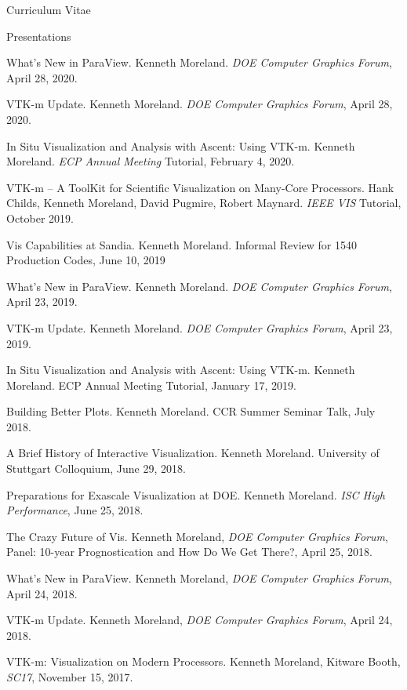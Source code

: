 \documentclass{article}
\begin{document}
\begin{cv}{Curriculum Vitae}
    \begin{cvlist}{Presentations}
    \item[What's New in ParaView.]
      Kenneth Moreland.
      \emph{DOE Computer Graphics Forum}, April 28, 2020.
    \item[VTK-m Update.]
      Kenneth Moreland.
      \emph{DOE Computer Graphics Forum}, April 28, 2020.
    \item[In Situ Visualization and Analysis with Ascent: Using VTK-m.]
      Kenneth Moreland.
      \emph{ECP Annual Meeting} Tutorial, February 4, 2020.
    \item[VTK-m -- A ToolKit for Scientific Visualization on Many-Core Processors.]
      Hank Childs, Kenneth Moreland, David Pugmire, Robert Maynard.
      \emph{IEEE VIS} Tutorial, October 2019.
    \item[Vis Capabilities at Sandia.]
      Kenneth Moreland.
      Informal Review for 1540 Production Codes, June 10, 2019
    \item[What's New in ParaView.]
      Kenneth Moreland.
      \emph{DOE Computer Graphics Forum}, April 23, 2019.
    \item[VTK-m Update.]
      Kenneth Moreland.
      \emph{DOE Computer Graphics Forum}, April 23, 2019.
    \item[In Situ Visualization and Analysis with Ascent: Using VTK-m.]
      Kenneth Moreland.
      ECP Annual Meeting Tutorial, January 17, 2019.
    \item[Building Better Plots.]
      Kenneth Moreland.
      CCR Summer Seminar Talk, July 2018.
    \item[A Brief History of Interactive Visualization.]
      Kenneth Moreland.
      University of Stuttgart Colloquium, June 29, 2018.
    \item[Preparations for Exascale Visualization at DOE.]
      Kenneth Moreland.
      \emph{ISC High Performance}, June 25, 2018.
    \item[The Crazy Future of Vis.]
      Kenneth Moreland, \emph{DOE Computer Graphics Forum}, Panel: 10-year Prognostication and How Do We Get There?, April 25, 2018.
    \item[What's New in ParaView.]
      Kenneth Moreland, \emph{DOE Computer Graphics Forum}, April 24, 2018.
    \item[VTK-m Update.]
      Kenneth Moreland, \emph{DOE Computer Graphics Forum}, April 24, 2018.
    \item[VTK-m: Visualization on Modern Processors.]
      Kenneth Moreland, Kitware Booth, \emph{SC17}, November 15, 2017.

\end{cvlist}
\end{cv}
\end{document}
